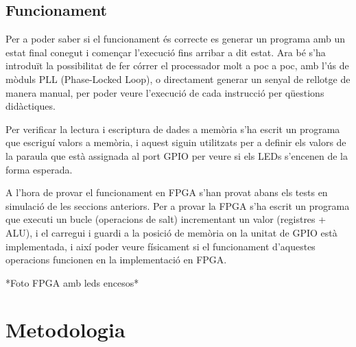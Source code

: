 \documentclass[10pt,a4paper,twocolumn,twoside]{article}
\begin{document}
    \subsection{Funcionament}
    
    Per a poder saber si el funcionament és correcte es generar un programa amb un estat final conegut i començar l'execució fins arribar a dit estat.
    Ara bé s’ha introduït la possibilitat de fer córrer el processador molt a poc a poc, amb l'ús de mòduls PLL (Phase-Locked Loop), o directament generar un senyal de rellotge de manera manual, per poder veure l’execució de cada instrucció per qüestions didàctiques.
    
    Per verificar la lectura i escriptura de dades a memòria s'ha escrit un programa que escriguí valors a memòria, i aquest siguin utilitzats per a definir els valors de la paraula que està assignada al port GPIO per veure si els LEDs s'encenen de la forma esperada.
    
    A l'hora de provar el funcionament en FPGA s'han provat abans els tests en simulació de les seccions anteriors.
    Per a provar la FPGA s'ha escrit un programa que executi un bucle (operacions de salt) incrementant un valor (registres + ALU), i el carregui i guardi a la posició de memòria on la unitat de GPIO està implementada, i així poder veure físicament si el funcionament d'aquestes operacions funcionen en la implementació en FPGA. 


    *Foto FPGA amb leds encesos*


\section{Metodologia}
\end{document}
